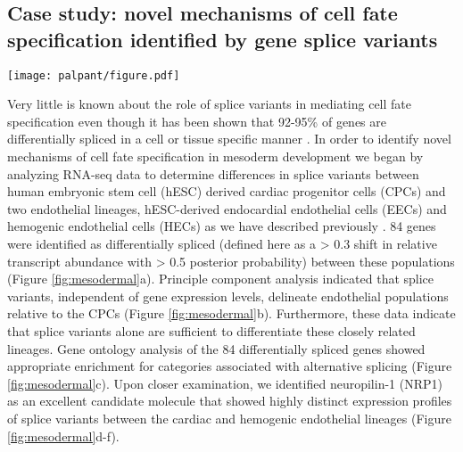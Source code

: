 \documentclass[twocolumn]{article}
\begin{document}
\subsection{Case study: novel mechanisms of cell fate specification identified
by gene splice variants}

\begin{figure*}
\begin{center}
\texttt{[image: palpant/figure.pdf]}
\end{center}
\caption{
\textbf{a}
Hierarchical clustering of the dominant splice variant for 84
differentially spliced genes. Blue arrows indicate genes with known function in
endothelial or heart development. Red arrows indicate genes in the class of
receptors that bind VEGF.
\textbf{b}
Two dimensional principle component analysis in mesodermal progenitor
populations showing discrete separation of populations entirely based on
differences in splice variants. 
\textbf{c}
Analysis of gene ontology showing enriched categories found in 84 differentially
spliced genes. (d-e) Heat map analysis 
\textbf{d}
Heat map showing expression of annotated isoforms of NRP1.
\textbf{e}
Read coverage over isoforms of NRP1.
\textbf{f}
Schematic diagram of protein domains encoded by splice variant variants of NRP1.}
\label{fig:mesodermal}
\end{figure*}

Very little is known about the role of splice variants in mediating cell fate
specification even though it has been shown that 92-95\% of genes are
differentially spliced in a cell or tissue specific manner \cite{Wang:2008ea,
Pan:2008jq}. In order to identify novel mechanisms of cell fate specification in
mesoderm development we began by analyzing RNA-seq data to determine differences
in splice variants between human embryonic stem cell (hESC) derived cardiac
progenitor cells (CPCs) and two endothelial lineages, hESC-derived endocardial
endothelial cells (EECs) and hemogenic endothelial cells (HECs) as we have
described previously \cite{Palpant:2015dv}. 84 genes were identified as
differentially spliced (defined here as a > 0.3 shift in relative transcript
abundance with > 0.5 posterior probability) between these populations (Figure
\ref{fig:mesodermal}a).  Principle component analysis indicated that splice
variants, independent of gene expression levels, delineate endothelial
populations relative to the CPCs (Figure \ref{fig:mesodermal}b). Furthermore,
these data indicate that splice variants alone are sufficient to differentiate
these closely related lineages.  Gene ontology analysis of the 84 differentially
spliced genes showed appropriate enrichment for categories associated with
alternative splicing (Figure \ref{fig:mesodermal}c). Upon closer examination, we
identified neuropilin-1 (NRP1) as an excellent candidate molecule that showed
highly distinct expression profiles of splice variants between the cardiac and
hemogenic endothelial lineages (Figure \ref{fig:mesodermal}d-f). 
\end{document}
